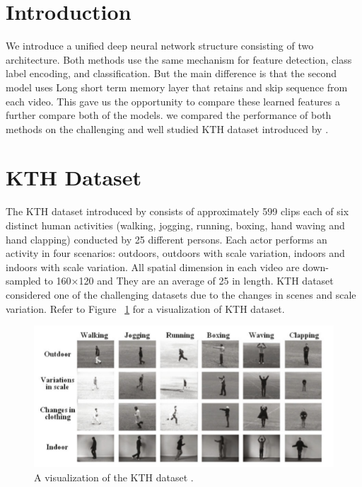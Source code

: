 \section{Introduction}
We introduce a unified deep neural network structure consisting of two architecture. Both methods use the same mechanism for feature detection, class label encoding, and classification. But the main difference is that the second model uses Long short term memory layer that retains and skip sequence from each video. This gave us the opportunity to compare these learned features a further compare both of the models. we compared the performance of both methods on the challenging and well studied KTH dataset introduced by \cite{schuldt2004recognizing}.

\section{KTH Dataset}
The KTH dataset introduced by \cite{laptev2004recognizing} consists of approximately 599 clips each of six distinct human activities (walking, jogging, running, boxing, hand waving and hand clapping) conducted by 25 different persons. Each actor performs an activity in four scenarios: outdoors, outdoors with scale variation, indoors and indoors with scale variation. All spatial dimension in each video are down-sampled to 160×120 and They are an average of 25 in length. KTH dataset considered
one of the challenging datasets due to the changes in scenes and scale variation. Refer to Figure ~\ref{fig:datasetset1KTH} for a visualization of KTH dataset. 

\begin{figure}[th]
\centering
\includegraphics[width=0.85\columnwidth]{Chapters/photos/dt1.png}
\decoRule
\caption[A visualization of the KTH dataset \cite{schuldt2004recognizing}.]{A visualization of the KTH dataset \cite{schuldt2004recognizing}.}
\label{fig:datasetset1KTH}
\end{figure}\\

